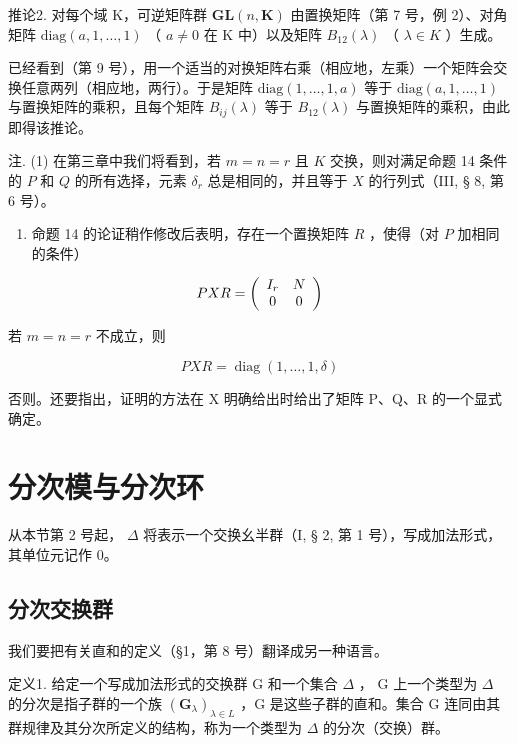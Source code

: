 推论2. 对每个域 K，可逆矩阵群 \(\mathbf{GL}(n,\mathbf{K})\) 由置换矩阵（第 7 号，例 2）、对角矩阵 \(\text{diag}(a,1,\ldots,1)\) （ \(a\neq0\) 在 K 中）以及矩阵 \(B_{12}(\lambda)\) （ \(\lambda\in K\) ）生成。

已经看到（第 9 号），用一个适当的对换矩阵右乘（相应地，左乘）一个矩阵会交换任意两列（相应地，两行）。于是矩阵 \(\text{diag}(1, \ldots, 1, a)\) 等于 \(\text{diag}(a, 1, \ldots, 1)\) 与置换矩阵的乘积，且每个矩阵 \(B_{ij}(\lambda)\) 等于 \(B_{12}(\lambda)\) 与置换矩阵的乘积，由此即得该推论。

注. (1) 在第三章中我们将看到，若 \(m = n = r\) 且 \(K\) 交换，则对满足命题 14 条件的 \(P\) 和 \(Q\) 的所有选择，元素 \(\delta_r\) 总是相同的，并且等于 \(X\) 的行列式（III, § 8, 第 6 号）。

\begin{enumerate}
\def\labelenumi{(\arabic{enumi})}
\setcounter{enumi}{1}
\tightlist
\item
  命题 14 的论证稍作修改后表明，存在一个置换矩阵 \(R\) ，使得（对 \(P\) 加相同的条件）
\end{enumerate}

\[
P X R = \left( \begin{array}{c c} I _ {r} & N \\ 0 & 0 \end{array} \right)
\]

若 \(m = n = r\) 不成立，则

\[
P X R = \operatorname{diag} (1, \dots , 1, \delta)
\]

否则。还要指出，证明的方法在 X 明确给出时给出了矩阵 P、Q、R 的一个显式确定。

\section{分次模与分次环}

从本节第 2 号起， \(\Delta\) 将表示一个交换幺半群（I, § 2, 第 1 号），写成加法形式，其单位元记作 0。

\subsection{分次交换群}

我们要把有关直和的定义（§1，第 8 号）翻译成另一种语言。

定义1. 给定一个写成加法形式的交换群 G 和一个集合 \(\Delta\) ， G 上一个类型为 \(\Delta\) 的分次是指子群的一个族 \((\mathbf{G}_{\lambda})_{\lambda \in L}\) ，G 是这些子群的直和。集合 G 连同由其群规律及其分次所定义的结构，称为一个类型为 \(\Delta\) 的分次（交换）群。

